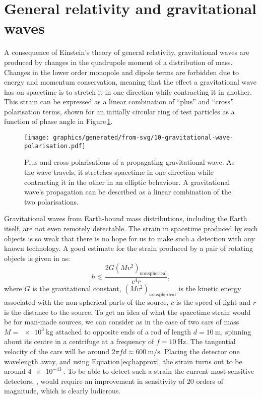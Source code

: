 \section{General relativity and gravitational waves}
A consequence of Einstein's theory of general relativity, gravitational waves are produced by changes in the quadrupole moment of a distribution of mass. Changes in the lower order monopole and dipole terms are forbidden due to energy and momentum conservation, meaning that the effect a gravitational wave has on spacetime is to stretch it in one direction while contracting it in another. This strain can be expressed as a linear combination of ``plus'' and ``cross'' polarisation terms, shown for an initially circular ring of test particles as a function of phase angle in Figure\,\ref{fig:gravitational-wave-polarisation}.

\begin{figure}
  \centering
  \texttt{[image: graphics/generated/from-svg/10-gravitational-wave-polarisation.pdf]}
  \caption[Plus and cross polarisations of a propagating gravitational wave]{\label{fig:gravitational-wave-polarisation}Plus and cross polarisations of a propagating gravitational wave. As the wave travels, it stretches spacetime in one direction while contracting it in the other in an elliptic behaviour. A gravitational wave's propagation can be described as a linear combination of the two polarisations.}
\end{figure}

Gravitational waves from Earth-bound mass distributions, including the Earth itself, are not even remotely detectable. The strain in spacetime produced by such objects is so weak that there is no hope for us to make such a detection with any known technology. A good estimate for the strain produced by a pair of rotating objects is given in \cite{Sathyaprakash2009} as:
\begin{equation}
  \label{eq:happrox}
  h \lesssim \frac{2 G \left( M v^{2} \right)_{\text{nonspherical}}}{c^4 r},
\end{equation}
where $G$ is the gravitational constant, $\left( M v^{2} \right)_{\text{nonspherical}}$ is the kinetic energy associated with the non-spherical parts of the source, $c$ is the speed of light and $r$ is the distance to the source. To get an idea of what the spacetime strain would be for man-made sources, we can consider as in \cite{Sathyaprakash2009} the case of two cars of mass $M = \SI{e3}{\kilo\gram}$ attached to opposite ends of a rod of length $d = \SI{10}{\meter}$, spinning about its centre in a centrifuge at a frequency of $f = \SI{10}{\hertz}$. The tangential velocity of the cars will be around $2 \pi f d \approx \SI{600}{\meter\per\second}$. Placing the detector one wavelength away, and using Equation\,\ref{eq:happrox}, the strain turns out to be around $\SI{4e-43}{}$. To be able to detect such a strain the current most sensitive detectors, \ALIGO{}, would require an improvement in sensitivity of \SI{20}{} orders of magnitude, which is clearly ludicrous.

